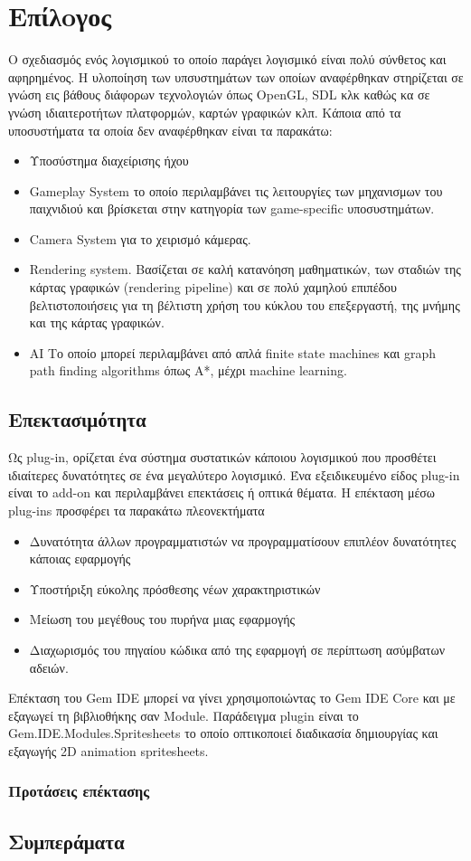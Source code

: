 \chapter{Επίλoγος}
Ο σχεδιασμός ενός λογισμικού το οποίο παράγει λογισμικό είναι πολύ σύνθετος και αφηρημένος. Η υλοποίηση των υπσυστημάτων των οποίων αναφέρθηκαν στηρίζεται σε γνώση εις βάθους διάφορων τεχνολογιών όπως OpenGL, SDL κλκ καθώς κα σε γνώση ιδιαιτεροτήτων πλατφορμών, καρτών γραφικών κλπ. Κάποια από τα υποσυστήματα τα οποία δεν αναφέρθηκαν είναι τα παρακάτω:
\begin{itemize}
	\item Υποσύστημα διαχείρισης ήχου
	\item Gameplay System το οποίο περιλαμβάνει τις λειτουργίες των μηχανισμων του παιχνιδιού και βρίσκεται στην κατηγορία των game-specific υποσυστημάτων.
	\item Camera System για το χειρισμό κάμερας. 
	\item Rendering system. Βασίζεται σε καλή κατανόηση μαθηματικών, των σταδιών της κάρτας γραφικών (rendering pipeline) και σε πολύ χαμηλού επιπέδου βελτιστοποιήσεις για τη βέλτιστη χρήση του κύκλου του επεξεργαστή, της μνήμης και της κάρτας γραφικών.
	\item AI Το οποίο μπορεί περιλαμβάνει από απλά finite state machines και graph path finding algorithms όπως Α*, μέχρι machine learning. 
	
\end{itemize}
\section{Επεκτασιμότητα}	
	Ως plug-in, ορίζεται ένα σύστημα συστατικών κάποιου λογισμικού που προσθέτει ιδιαίτερες δυνατότητες σε ένα μεγαλύτερο λογισμικό. Ένα εξειδικευμένο είδος plug-in είναι το add-on και περιλαμβάνει επεκτάσεις ή οπτικά θέματα. Η επέκταση μέσω plug-ins προσφέρει τα παρακάτω πλεονεκτήματα
	\begin{itemize}
		\item Δυνατότητα άλλων προγραμματιστών να προγραμματίσουν επιπλέον δυνατότητες κάποιας εφαρμογής
		\item Υποστήριξη εύκολης πρόσθεσης νέων χαρακτηριστικών
		\item Μείωση του μεγέθους του πυρήνα μιας εφαρμογής
		\item Διαχωρισμός του πηγαίου κώδικα από της εφαρμογή σε περίπτωση ασύμβατων αδειών.
	\end{itemize}
	Επέκταση του Gem IDE μπορεί να γίνει χρησιμοποιώντας το Gem IDE Core και με εξαγωγεί τη βιβλιοθήκης σαν Module. Παράδειγμα plugin είναι το Gem.IDE.Modules.Spritesheets το οποίο οπτικοποιεί διαδικασία δημιουργίας και εξαγωγής 2D animation spritesheets.	
	\subsection{Προτάσεις επέκτασης}
	
\section{Συμπεράματα}

